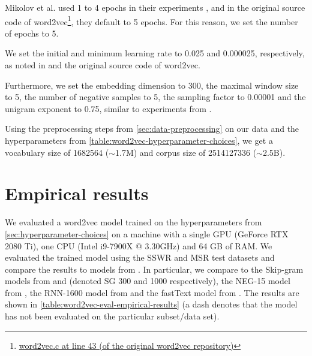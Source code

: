 Mikolov et al. used 1 to 4 epochs in their experiments \cite{mikolov2013a, mikolov2013b}, and in the original source code of word2vec\footnote{\href{https://github.com/tmikolov/word2vec/blob/e092540633572b883e25b367938b0cca2cf3c0e7/word2vec.c/\#L43}{word2vec.c at line 43 (of the original word2vec repository)}}, they default to 5 epochs. For this reason, we set the number of epochs to 5.

We set the initial and minimum learning rate to 0.025 and 0.000025, respectively, as noted in \cite{mikolov2013a} and the original source code of word2vec.

Furthermore, we set the embedding dimension to 300, the maximal window size to 5, the number of negative samples to 5, the sampling factor to 0.00001 and the unigram exponent to 0.75, similar to experiments from \cite{mikolov2013b}.

Using the preprocessing steps from \cref{sec:data-preprocessing} on our data and the hyperparameters from \cref{table:word2vec-hyperparameter-choices}, we get a vocabulary size of 1682564 ($\sim$1.7M) and corpus size of 2514127336 ($\sim$2.5B).

\section{Empirical results}
We evaluated a word2vec model trained on the hyperparameters from \cref{sec:hyperparameter-choices} on a machine with a single GPU (GeForce RTX 2080 Ti), one CPU (Intel i9-7900X @ 3.30GHz) and 64 GB of RAM. We evaluated the trained model using the SSWR and MSR test datasets and compare the results to models from \cite{mikolov2013a, mikolov2013b, mikolov-etal-2013-linguistic, bojanowski2017enriching}. In particular, we compare to the Skip-gram models from \cite[Table 3]{mikolov2013a} and \cite[Table 6]{mikolov2013a} (denoted SG 300 and 1000 respectively), the NEG-15 model from \cite[Table 1]{mikolov2013b}, the RNN-1600 model from \cite[Table 2]{mikolov-etal-2013-linguistic} and the fastText model from \cite[Table 2]{bojanowski2017enriching}. The results are shown in \cref{table:word2vec-eval-empirical-results} (a dash denotes that the model has not been evaluated on the particular subset/data set).

